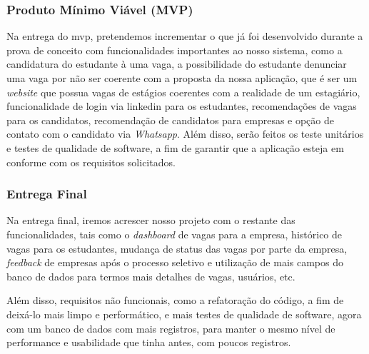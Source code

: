 \subsubsection{Produto Mínimo Viável (MVP)}

Na entrega do \ac{mvp}, pretendemos incrementar o que já foi desenvolvido durante a prova de conceito com funcionalidades importantes ao nosso sistema, como a candidatura do estudante à uma vaga, a possibilidade do estudante denunciar uma vaga por não ser coerente com a proposta da nossa aplicação, que é ser um \emph{website} que possua vagas de estágios coerentes com a realidade de um estagiário, funcionalidade de login via \gls{linkedin} para os estudantes, recomendações de vagas para os candidatos, recomendação de candidatos para empresas e opção de contato com o candidato via \emph{Whatsapp}. Além disso, serão feitos os teste unitários e testes de qualidade de software, a fim de garantir que a aplicação esteja em conforme com os requisitos solicitados.

\subsubsection{Entrega Final}

Na entrega final, iremos acrescer nosso projeto com o restante das funcionalidades, tais como o \emph{dashboard} de vagas para a empresa, histórico de vagas para os estudantes, mudança de status das vagas por parte da empresa, \emph{feedback} de empresas após o processo seletivo e utilização de mais campos do banco de dados para termos mais detalhes de vagas, usuários, etc.

Além disso, requisitos não funcionais, como a refatoração do código, a fim de deixá-lo mais limpo e performático, e mais testes de qualidade de software, agora com um banco de dados com mais registros, para manter o mesmo nível de performance e usabilidade que tinha antes, com poucos registros.